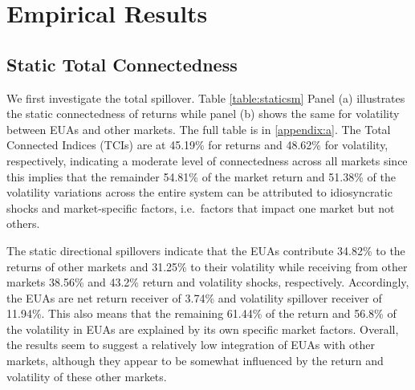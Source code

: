 \documentclass[preprint, 3p,
authoryear]{elsarticle} %
\begin{document}
\hypertarget{empirical-results}{%
\section{Empirical Results}\label{empirical-results}}

\hypertarget{static-total-connectedness}{%
\subsection{Static Total
Connectedness}\label{static-total-connectedness}}

We first investigate the total spillover. Table \ref{table:staticsm}
Panel (a) illustrates the static connectedness of returns while panel
(b) shows the same for volatility between EUAs and other markets. The
full table is in \ref{appendix:a}. The Total Connected Indices (TCIs)
are at 45.19\% for returns and 48.62\% for volatility, respectively,
indicating a moderate level of connectedness across all markets since
this implies that the remainder 54.81\% of the market return and 51.38\%
of the volatility variations across the entire system can be attributed
to idiosyncratic shocks and market-specific factors, i.e.~factors that
impact one market but not others.

The static directional spillovers indicate that the EUAs contribute
34.82\% to the returns of other markets and 31.25\% to their volatility
while receiving from other markets 38.56\% and 43.2\% return and
volatility shocks, respectively. Accordingly, the EUAs are net return
receiver of 3.74\% and volatility spillover receiver of 11.94\%. This
also means that the remaining 61.44\% of the return and 56.8\% of the
volatility in EUAs are explained by its own specific market factors.
Overall, the results seem to suggest a relatively low integration of
EUAs with other markets, although they appear to be somewhat influenced
by the return and volatility of these other markets.
\end{document}
